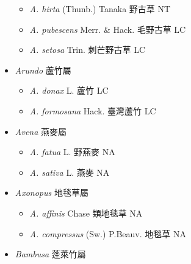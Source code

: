 \begin{itemize}
  \begin{itemize}
        \item[] \textit{A. hirta} (Thunb.) Tanaka  野古草   NT
        \item[] \textit{A. pubescens} Merr. \& Hack.  毛野古草   LC
        \item[] \textit{A. setosa} Trin.  刺芒野古草   LC
  \end{itemize}
 \item[] \textit{Arundo} 蘆竹屬
                                
  \begin{itemize}
        \item[] \textit{A. donax} L.  蘆竹   LC
        \item[] \textit{A. formosana} Hack.  臺灣蘆竹   LC
  \end{itemize}
 \item[] \textit{Avena} 燕麥屬
                                
  \begin{itemize}
        \item[] \textit{A. fatua} L.  野燕麥   NA
        \item[] \textit{A. sativa} L.  燕麥   NA
  \end{itemize}
 \item[] \textit{Axonopus} 地毯草屬
                                
  \begin{itemize}
        \item[] \textit{A. affinis} Chase  類地毯草   NA
        \item[] \textit{A. compressus} (Sw.) P.Beauv.  地毯草   NA
  \end{itemize}
 \item[] \textit{Bambusa} 蓬萊竹屬
                                

\end{itemize}
